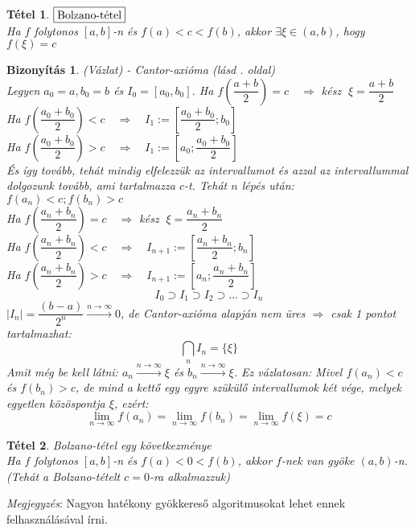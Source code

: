 \documentclass[a4paper,12pt,twoside]{book}
\newtheorem{tetel}{Tétel}[chapter]
\theoremstyle{break}
\newtheorem{biz}{Bizonyítás}[chapter]
\theoremstyle{plain}
\begin{document}
\begin{tetel}\label{Bolzano} $\boxed{$Bolzano-tétel$}$\\
 Ha $f$ folytonos $[a,b]$-n és $f(a)<c<f(b)$, akkor $\exists\xi\in(a,b)$, hogy $f(\xi)=c$
\end{tetel}
\begin{biz} (Vázlat) - Cantor-axióma (lásd \pageref{Cantor}. oldal)\\
 Legyen $a_0=a, b_0 = b$ és $I_0 = [a_0,b_0]$. Ha $f\left(\dfrac{a+b}{2}\right)=c \quad \Rightarrow $ kész $\; \xi = \dfrac{a+b}{2}$\\
 Ha $f\left(\dfrac{a_0+b_0}{2}\right)<c \quad \Rightarrow \quad I_1 := \left[\dfrac{a_0+b_0}{2};b_0\right]$\\
 Ha $f\left(\dfrac{a_0+b_0}{2}\right)>c \quad \Rightarrow \quad I_1 := \left[a_0;\dfrac{a_0+b_0}{2}\right]$\\
 És így tovább, tehát mindig elfelezzük az intervallumot és azzal az intervallummal dolgozunk tovább, ami tartalmazza $c$-t. Tehát $n$ lépés után: $f(a_n)<c; f(b_n)>c$\\
 Ha $f\left(\dfrac{a_n+b_n}{2}\right)=c \quad \Rightarrow $ kész $\; \xi = \dfrac{a_n+b_n}{2}$\\
 Ha $f\left(\dfrac{a_n+b_n}{2}\right)<c \quad \Rightarrow \quad I_{n+1} := \left[\dfrac{a_n+b_n}{2};b_n\right]$\\
 Ha $f\left(\dfrac{a_n+b_n}{2}\right)>c \quad \Rightarrow \quad I_{n+1} := \left[a_n;\dfrac{a_n+b_n}{2}\right]$\\
 \[I_0 \supset I_1 \supset I_2 \supset \ldots \supset I_n\]
 $|I_n| = \dfrac{(b-a)}{2^n} \xrightarrow{n\to\infty} 0$, de Cantor-axióma alapján nem üres $\Rightarrow$ csak 1 pontot tartalmazhat:
 \[\bigcap_{n} I_n = \{\xi\}\]
 Amit még be kell látni: $a_n \xrightarrow{n\to\infty} \xi$ és $b_n \xrightarrow{n\to\infty} \xi$. Ez vázlatosan:
 Mivel $f(a_n) < c$ és $f(b_n) > c$, de mind a kettő egy egyre szükülő intervallumok két vége, melyek egyetlen közöspontja $\xi$, ezért:
 \[\lim_{n\to\infty} f(a_n) = \lim_{n\to\infty} f(b_n) = \lim_{n\to\infty} f(\xi) = c\]
\end{biz}

\begin{tetel} Bolzano-tétel egy következménye\\
 Ha $f$ folytonos $[a,b]$-n és $f(a)<0<f(b)$, akkor $f$-nek van gyöke $(a, b)$-n. (Tehát a Bolzano-tételt $c=0$-ra alkalmazzuk)
\end{tetel}
\emph{Megjegyzés}: Nagyon hatékony gyökkereső algoritmusokat lehet ennek felhasználásával írni.
\addtocounter{biz}{1} %
\end{document}
